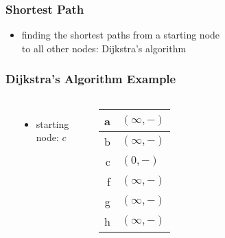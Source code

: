 \documentclass[dvipsnames]{beamer}
\begin{document}
\begin{frame}
  \frametitle{Shortest Path}

  \begin{itemize}
    \item finding the shortest paths from a starting node\\
      to all other nodes:
      Dijkstra's algorithm
  \end{itemize}
\end{frame}

\begin{frame}
  \frametitle{Dijkstra's Algorithm Example}

  \begin{example}[initialization]
    \begin{columns}
      \begin{center}
      \end{center}

      \begin{itemize}
        \item starting node: $c$
      \end{itemize}

      \begin{table}
        \begin{tabular}{r|l}
          a & $(\infty,-)$ \\\hline
          b & $(\infty,-)$ \\\hline
          c & $(0,-)$      \\\hline
          f & $(\infty,-)$ \\\hline
          g & $(\infty,-)$ \\\hline
          h & $(\infty,-)$
        \end{tabular}
      \end{table}
    \end{columns}
  \end{example}
\end{frame}
\end{document}
